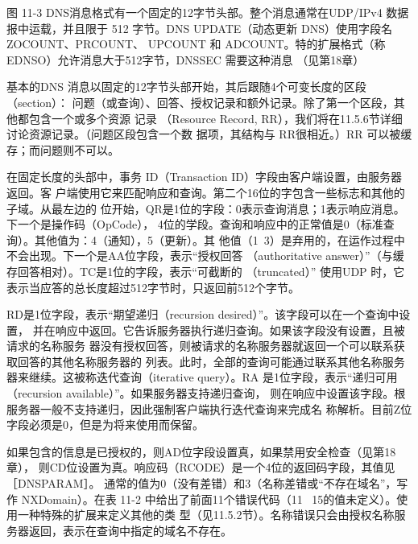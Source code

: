 图 11-3
DNS消息格式有一个固定的12字节头部。整个消息通常在UDP/IPv4 数据报中运载，并且限于
512 字节。DNS UPDATE（动态更新 DNS）使用字段名 ZOCOUNT、PRCOUNT、 UPCOUNT 和
ADCOUNT。特的扩展格式（称 EDNSO）允许消息大于512字节，DNSSEC 需要这种消息
（见第18章）

基本的DNS 消息以固定的12字节头部开始，其后跟随4个可变长度的区段（section）：
问题（或查询）、回答、授权记录和额外记录。除了第一个区段，其他都包含一个或多个资源
记录 （Resource Record, RR），我们将在11.5.6节详细讨论资源记录。（问题区段包含一个数
据项，其结构与 RR很相近。）RR 可以被缓存；而问题则不可以。

在固定长度的头部中，事务 ID（Transaction ID）字段由客户端设置，由服务器返回。客
户端使用它来匹配响应和查询。第二个16位的字包含一些标志和其他的子域。从最左边的
位开始，QR是1位的字段：0表示查询消息；1表示响应消息。下一个是操作码（OpCode），
4位的学段。查询和响应中的正常值是0（标准查询）。其他值为：4（通知），5（更新）。其
他值（1~3）是弃用的，在运作过程中不会出现。下一个是AA位字段，表示“授权回答
（authoritative answer）”（与缓存回答相对）。TC是1位的字段，表示“可截断的 （truncated）”
使用UDP 时，它表示当应答的总长度超过512字节时，只返回前512个字节。

RD是1位字段，表示“期望递归（recursion desired）”。该字段可以在一个查询中设置，
并在响应中返回。它告诉服务器执行递归查询。如果该字段没有设置，且被请求的名称服务
器没有授权回答，则被请求的名称服务器就返回一个可以联系获取回答的其他名称服务器的
列表。此时，全部的查询可能通过联系其他名称服务器来继续。这被称迭代查询（iterative
query）。RA 是1位字段，表示“递归可用（recursion available）”。如果服务器支持递归查询，
则在响应中设置该字段。根服务器一般不支持递归，因此强制客户端执行迭代查询来完成名
称解析。目前Z位字段必须是0，但是为将来使用而保留。

如果包含的信息是已授权的，则AD位字段设置真，如果禁用安全检查（见第18章），
则CD位设置为真。响应码（RCODE）是一个4位的返回码字段，其值见 ［DNSPARAM］。
通常的值为0（没有差错）和3（名称差错或“不存在域名”，写作 NXDomain）。在表 11-2
中给出了前面11个错误代码（11 ~15的值未定义）。使用一种特殊的扩展来定义其他的类
型（见11.5.2节）。名称错误只会由授权名称服务器返回，表示在查询中指定的域名不存在。

